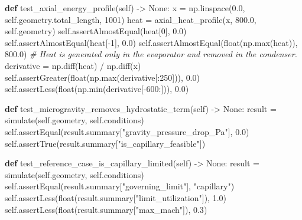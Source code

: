 \documentclass[
  12pt,
  12pt,a4paper,oneside]{report}
\newenvironment{Shaded}{}{}
\newcommand{\BuiltInTok}[1]{\textcolor[rgb]{0.00,0.50,0.00}{#1}}
\newcommand{\CommentTok}[1]{\textcolor[rgb]{0.38,0.63,0.69}{\textit{#1}}}
\newcommand{\DecValTok}[1]{\textcolor[rgb]{0.25,0.63,0.44}{#1}}
\newcommand{\FloatTok}[1]{\textcolor[rgb]{0.25,0.63,0.44}{#1}}
\newcommand{\KeywordTok}[1]{\textcolor[rgb]{0.00,0.44,0.13}{\textbf{#1}}}
\newcommand{\NormalTok}[1]{#1}
\newcommand{\OperatorTok}[1]{\textcolor[rgb]{0.40,0.40,0.40}{#1}}
\newcommand{\StringTok}[1]{\textcolor[rgb]{0.25,0.44,0.63}{#1}}
\newcommand{\VariableTok}[1]{\textcolor[rgb]{0.10,0.09,0.49}{#1}}
\begin{document}
\begin{Shaded}
\begin{Highlighting}[]
    \KeywordTok{def}\NormalTok{ test\_axial\_energy\_profile(}\VariableTok{self}\NormalTok{) }\OperatorTok{{-}\textgreater{}} \VariableTok{None}\NormalTok{:}
\NormalTok{        x }\OperatorTok{=}\NormalTok{ np.linspace(}\FloatTok{0.0}\NormalTok{, }\VariableTok{self}\NormalTok{.geometry.total\_length, }\DecValTok{1001}\NormalTok{)}
\NormalTok{        heat }\OperatorTok{=}\NormalTok{ axial\_heat\_profile(x, }\FloatTok{800.0}\NormalTok{, }\VariableTok{self}\NormalTok{.geometry)}
        \VariableTok{self}\NormalTok{.assertAlmostEqual(heat[}\DecValTok{0}\NormalTok{], }\FloatTok{0.0}\NormalTok{)}
        \VariableTok{self}\NormalTok{.assertAlmostEqual(heat[}\OperatorTok{{-}}\DecValTok{1}\NormalTok{], }\FloatTok{0.0}\NormalTok{)}
        \VariableTok{self}\NormalTok{.assertAlmostEqual(}\BuiltInTok{float}\NormalTok{(np.}\BuiltInTok{max}\NormalTok{(heat)), }\FloatTok{800.0}\NormalTok{)}
        \CommentTok{\# Heat is generated only in the evaporator and removed in the condenser.}
\NormalTok{        derivative }\OperatorTok{=}\NormalTok{ np.diff(heat) }\OperatorTok{/}\NormalTok{ np.diff(x)}
        \VariableTok{self}\NormalTok{.assertGreater(}\BuiltInTok{float}\NormalTok{(np.}\BuiltInTok{max}\NormalTok{(derivative[:}\DecValTok{250}\NormalTok{])), }\FloatTok{0.0}\NormalTok{)}
        \VariableTok{self}\NormalTok{.assertLess(}\BuiltInTok{float}\NormalTok{(np.}\BuiltInTok{min}\NormalTok{(derivative[}\OperatorTok{{-}}\DecValTok{600}\NormalTok{:])), }\FloatTok{0.0}\NormalTok{)}

    \KeywordTok{def}\NormalTok{ test\_microgravity\_removes\_hydrostatic\_term(}\VariableTok{self}\NormalTok{) }\OperatorTok{{-}\textgreater{}} \VariableTok{None}\NormalTok{:}
\NormalTok{        result }\OperatorTok{=}\NormalTok{ simulate(}\VariableTok{self}\NormalTok{.geometry, }\VariableTok{self}\NormalTok{.conditions)}
        \VariableTok{self}\NormalTok{.assertEqual(result.summary[}\StringTok{"gravity\_pressure\_drop\_Pa"}\NormalTok{], }\FloatTok{0.0}\NormalTok{)}
        \VariableTok{self}\NormalTok{.assertTrue(result.summary[}\StringTok{"is\_capillary\_feasible"}\NormalTok{])}

    \KeywordTok{def}\NormalTok{ test\_reference\_case\_is\_capillary\_limited(}\VariableTok{self}\NormalTok{) }\OperatorTok{{-}\textgreater{}} \VariableTok{None}\NormalTok{:}
\NormalTok{        result }\OperatorTok{=}\NormalTok{ simulate(}\VariableTok{self}\NormalTok{.geometry, }\VariableTok{self}\NormalTok{.conditions)}
        \VariableTok{self}\NormalTok{.assertEqual(result.summary[}\StringTok{"governing\_limit"}\NormalTok{], }\StringTok{"capillary"}\NormalTok{)}
        \VariableTok{self}\NormalTok{.assertLess(}\BuiltInTok{float}\NormalTok{(result.summary[}\StringTok{"limit\_utilization"}\NormalTok{]), }\FloatTok{1.0}\NormalTok{)}
        \VariableTok{self}\NormalTok{.assertLess(}\BuiltInTok{float}\NormalTok{(result.summary[}\StringTok{"max\_mach"}\NormalTok{]), }\FloatTok{0.3}\NormalTok{)}


\end{Highlighting}
\end{Shaded}
\end{document}
